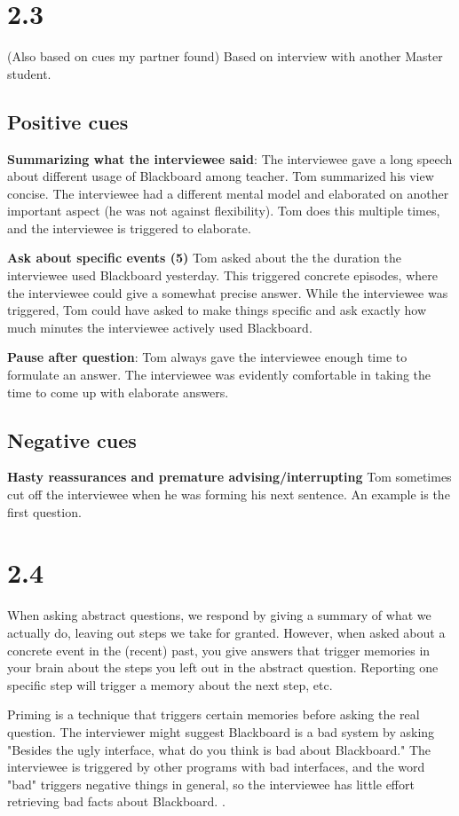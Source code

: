 \section*{2.3}
(Also based on cues my partner found)
Based on interview with another Master student.

\subsection*{Positive cues}
\textbf{Summarizing what the interviewee said}: The interviewee gave a long speech about different usage of Blackboard among teacher. Tom summarized his view concise. The interviewee had a different mental model and elaborated on another important aspect (he was not against flexibility). Tom does this multiple times, and the interviewee is triggered to elaborate.

\textbf{Ask about specific events (5)} Tom asked about the the duration the interviewee used Blackboard yesterday. This triggered concrete episodes, where the interviewee could give a somewhat precise answer. While the interviewee was triggered, Tom could have asked to make things specific and ask exactly how much minutes the interviewee actively used Blackboard.

\textbf{Pause after question}: Tom always gave the interviewee enough time to formulate an answer. The interviewee was evidently comfortable in taking the time to come up with elaborate answers.

\subsection*{Negative cues}

\textbf{Hasty reassurances and premature advising/interrupting} Tom sometimes cut off the interviewee when he was forming his next sentence. An example is the first question. 

\section*{2.4}
When asking abstract questions, we respond by giving a summary of what we actually do, leaving out steps we take for granted. However, when asked about a concrete event in the (recent) past, you give answers that trigger memories in your brain about the steps you left out in the abstract question. Reporting one specific step will trigger a memory about the next step, etc. \cite{apprenticing}

Priming is a technique that triggers certain memories before asking the real question. The interviewer might suggest Blackboard is a bad system by asking "Besides the ugly interface, what do you think is bad about Blackboard." The interviewee is triggered by other programs with bad interfaces, and the word "bad" triggers negative things in general, so the interviewee has little effort retrieving bad facts about Blackboard. \cite{kahneman}.

